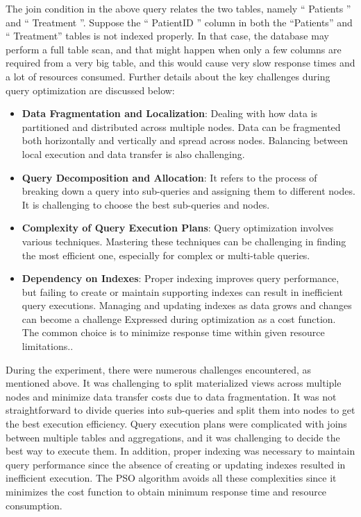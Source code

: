 

The join condition in the above query relates the two tables, namely `` Patients '' and `` Treatment ''. Suppose the `` PatientID '' column in both the ``Patients'' and `` Treatment'' tables is not indexed properly. In that case, the database may perform a full table scan, and that might happen when only a few columns are required from a very big table, and this would cause very slow response times and a lot of resources consumed. Further details about the key challenges during query optimization are discussed below:

\begin{itemize}
    \item\textbf{Data Fragmentation and Localization}: Dealing with how data is partitioned and distributed across multiple nodes. Data can be fragmented both horizontally and vertically and spread across nodes. Balancing between local execution and data transfer is also challenging. 
    \item\textbf{Query Decomposition and Allocation}: It refers to the process of breaking down a query into sub-queries and assigning them to different nodes. It is challenging to choose the best sub-queries and nodes.
    \item\textbf{Complexity of Query Execution Plans}: Query optimization involves various techniques. Mastering these techniques can be challenging in finding the most efficient one, especially for complex or multi-table queries.
    \item\textbf{Dependency on Indexes}: Proper indexing improves query performance, but failing to create or maintain supporting indexes can result in inefficient query executions. Managing and updating indexes as data grows and changes can become a challenge Expressed during optimization as a cost function. The common choice is to minimize response time within given resource limitations.\cite{team-2020,etutorials-03-2024,editor-ijmter-2015}.
\end{itemize}

During the experiment, there were numerous challenges encountered, as mentioned above. It was challenging to split materialized views across multiple nodes and minimize data transfer costs due to data fragmentation. It was not straightforward to divide queries into sub-queries and split them into nodes to get the best execution efficiency. Query execution plans were complicated with joins between multiple tables and aggregations, and it was challenging to decide the best way to execute them. In addition, proper indexing was necessary to maintain query performance since the absence of creating or updating indexes resulted in inefficient execution. The PSO algorithm avoids all these complexities since it minimizes the cost function to obtain minimum response time and resource consumption. 


